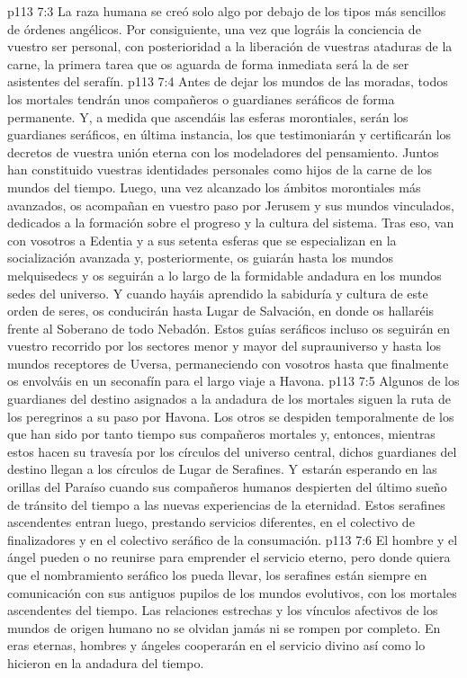 \vs p113 7:3 La raza humana se creó solo algo por debajo de los tipos más sencillos de órdenes angélicos. Por consiguiente, una vez que lográis la conciencia de vuestro ser personal, con posterioridad a la liberación de vuestras ataduras de la carne, la primera tarea que os aguarda de forma inmediata será la de ser asistentes del serafín.
\vs p113 7:4 Antes de dejar los mundos de las moradas, todos los mortales tendrán unos compañeros o guardianes seráficos de forma permanente. Y, a medida que ascendáis las esferas morontiales, serán los guardianes seráficos, en última instancia, los que testimoniarán y certificarán los decretos de vuestra unión eterna con los modeladores del pensamiento. Juntos han constituido vuestras identidades personales como hijos de la carne de los mundos del tiempo. Luego, una vez alcanzado los ámbitos morontiales más avanzados, os acompañan en vuestro paso por Jerusem y sus mundos vinculados, dedicados a la formación sobre el progreso y la cultura del sistema. Tras eso, van con vosotros a Edentia y a sus setenta esferas que se especializan en la socialización avanzada y, posteriormente, os guiarán hasta los mundos melquisedecs y os seguirán a lo largo de la formidable andadura en los mundos sedes del universo. Y cuando hayáis aprendido la sabiduría y cultura de este orden de seres, os conducirán hasta Lugar de Salvación, en donde os hallaréis frente al Soberano de todo Nebadón. Estos guías seráficos incluso os seguirán en vuestro recorrido por los sectores menor y mayor del suprauniverso y hasta los mundos receptores de Uversa, permaneciendo con vosotros hasta que finalmente os envolváis en un seconafín para el largo viaje a Havona.
\vs p113 7:5 Algunos de los guardianes del destino asignados a la andadura de los mortales siguen la ruta de los peregrinos a su paso por Havona. Los otros se despiden temporalmente de los que han sido por tanto tiempo sus compañeros mortales y, entonces, mientras estos hacen su travesía por los círculos del universo central, dichos guardianes del destino llegan a los círculos de Lugar de Serafines. Y estarán esperando en las orillas del Paraíso cuando sus compañeros humanos despierten del último sueño de tránsito del tiempo a las nuevas experiencias de la eternidad. Estos serafines ascendentes entran luego, prestando servicios diferentes, en el colectivo de finalizadores y en el colectivo seráfico de la consumación.
\vs p113 7:6 El hombre y el ángel pueden o no reunirse para emprender el servicio eterno, pero donde quiera que el nombramiento seráfico los pueda llevar, los serafines están siempre en comunicación con sus antiguos pupilos de los mundos evolutivos, con los mortales ascendentes del tiempo. Las relaciones estrechas y los vínculos afectivos de los mundos de origen humano no se olvidan jamás ni se rompen por completo. En eras eternas, hombres y ángeles cooperarán en el servicio divino así como lo hicieron en la andadura del tiempo.
